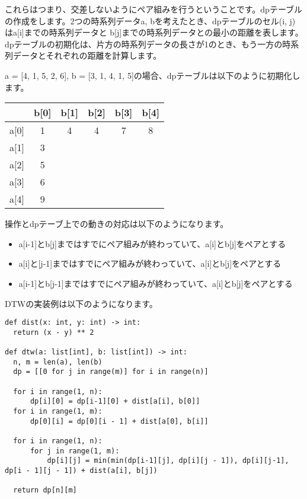 これらはつまり、交差しないようにペア組みを行うということです。dpテーブルの作成をします。2つの時系列データa, bを考えたとき、dpテーブルのセル(i, j)はa[i]までの時系列データと
b[j]までの時系列データとの最小の距離を表します。dpテーブルの初期化は、片方の時系列データの長さが1のとき、もう一方の時系列データとそれぞれの距離を計算します。

a = [4, 1, 5, 2, 6], b = [3, 1, 4, 1, 5]の場合、dpテーブルは以下のように初期化します。

\vspace{0.5cm}

\begin{table}[h]
  \centering
  \begin{tabular}{c|c|c|c|c|c|}
    & b[0] & b[1] & b[2] & b[3] & b[4]\\
    \hline
    a[0]&  1 & 4 & 4 & 7  & 8\\
    \hline
    a[1]&  3 &  &  &   & \\
    \hline
    a[2]&  5 &  &  &  & \\
    \hline
    a[3]&  6 &  &  &   & \\
    \hline
    a[4]&  9 &  &  &   & \\
    \hline
  \end{tabular}
\end{table}

\vspace{0.5cm}

操作とdpテーブ上での動きの対応は以下のようになります。

\begin{itemize}
  \item a[i-1]とb[j]まではすでにペア組みが終わっていて、a[i]とb[j]をペアとする
  \item a[i]と[j-1]まではすでにペア組みが終わっていて、a[i]とb[j]をペアとする
  \item a[i-1]とb[j-1]まではすでにペア組みが終わっていて、a[i]とb[j]をペアとする
\end{itemize}

DTWの実装例は以下のようになります。
\begin{lstlisting}[caption=DTWの実装, frame=TRBL, label={dtw}]
def dist(x: int, y: int) -> int:
  return (x - y) ** 2

def dtw(a: list[int], b: list[int]) -> int:
  n, m = len(a), len(b)
  dp = [[0 for j in range(m)] for i in range(n)]
  
  for i in range(1, n):
      dp[i][0] = dp[i-1][0] + dist[a[i], b[0]]
  for i in range(1, m):
      dp[0][i] = dp[0][i - 1] + dist[a[0], b[i]]
  
  for i in range(1, n):
      for j in range(1, m):
          dp[i][j] = min(min(dp[i-1][j], dp[i][j - 1]), dp[i][j-1], dp[i - 1][j - 1]) + dist(a[i], b[j])
  
  return dp[n][m]
\end{lstlisting}